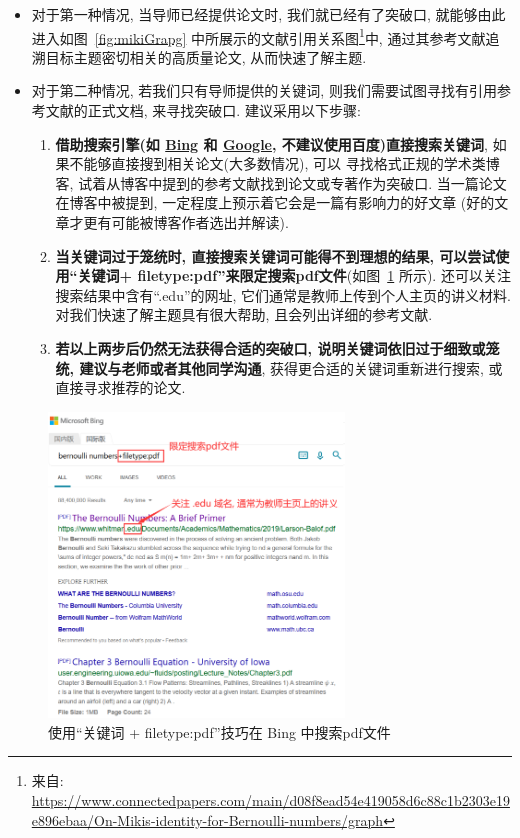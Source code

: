 \documentclass{formatBook}
\begin{document}
\begin{itemize}
    \item 对于第一种情况, 当导师已经提供论文时, 我们就已经有了突破口, 就能够由此进入如图~\ref{fig:mikiGrapg} 中所展示的文献引用关系图\footnote{来自: \url{https://www.connectedpapers.com/main/d08f8ead54e419058d6c88c1b2303e19e896ebaa/On-Mikis-identity-for-Bernoulli-numbers/graph}}中, 通过其参考文献追溯目标主题密切相关的高质量论文, 从而快速了解主题.
    \item 对于第二种情况, 若我们只有导师提供的关键词, 则我们需要试图寻找有引用参考文献的正式文档, 来寻找突破口. 建议采用以下步骤:
          \begin{enumerate}
              \item \textbf{借助搜索引擎(如 \href{https://www.bing.com/}{Bing} 和 \href{https://www.google.com/}{Google}, 不建议使用百度)直接搜索关键词}, 如果不能够直接搜到相关论文(大多数情况), 可以 寻找格式正规的学术类博客, 试着从博客中提到的参考文献找到论文或专著作为突破口. 当一篇论文在博客中被提到, 一定程度上预示着它会是一篇有影响力的好文章 (好的文章才更有可能被博客作者选出并解读).
              \item \textbf{当关键词过于笼统时, 直接搜索关键词可能得不到理想的结果, 可以尝试使用``关键词+ filetype:pdf''来限定搜索pdf文件}(如图~\ref{fig:bing} 所示). 还可以关注搜索结果中含有``.edu''的网址, 它们通常是教师上传到个人主页的讲义材料. 对我们快速了解主题具有很大帮助, 且会列出详细的参考文献.
              \item \textbf{若以上两步后仍然无法获得合适的突破口, 说明关键词依旧过于细致或笼统, 建议与老师或者其他同学沟通}, 获得更合适的关键词重新进行搜索, 或直接寻求推荐的论文.
          \end{enumerate}
\end{itemize}

\begin{figure}[H]
    \centering
    \includegraphics[width=0.7\textwidth]{figure/bingSearch.png}
    \caption{使用``关键词 + filetype:pdf''技巧在 Bing 中搜索pdf文件}
    \label{fig:bing}
\end{figure}
\end{document}
